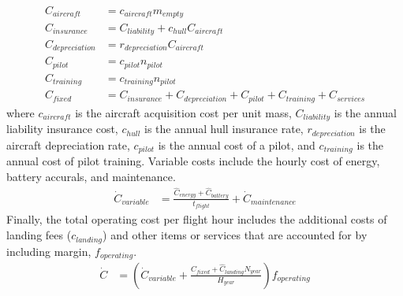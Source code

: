 \documentclass[12pt, letter]{article}
\begin{document}
\begin{align}
	C_{aircraft}&=c_{aircraft} m_{empty}\\
	C_{insurance}&=C_{liability}+c_{hull} C_{aircraft}\\
	C_{depreciation}&=r_{depreciation} C_{aircraft}\\
	C_{pilot}&=c_{pilot} n_{pilot}\\
	C_{training}&=c_{training} n_{pilot}\\
	C_{fixed}&=C_{insurance}+C_{depreciation}+C_{pilot}+C_{training}+C_{services}
\end{align}
where $c_{aircraft}$ is the aircraft acquisition cost per unit mass, $C_{liability}$ is the annual liability insurance cost, $c_{hull}$ is the annual hull insurance rate, $r_{depreciation}$ is the aircraft depreciation rate, $c_{pilot}$ is the annual cost of a pilot, and $c_{training}$ is the annual cost of pilot training. Variable costs include the hourly cost of energy, battery accurals, and maintenance.
\begin{align}
	\dot{C}_{variable}&=\frac{\hat{C}_{energy}+\hat{C}_{battery}}{t_{flight}}+\dot{C}_{maintenance}
\end{align}
Finally, the total operating cost per flight hour includes the additional costs of landing fees ($c_{landing}$) and other items or services that are accounted for by including margin, $f_{operating}$.
\begin{align}
	\dot{C}&=\left(\dot{C}_{variable}+\frac{C_{fixed}+\hat{C}_{landing}N_{year}}{H_{year}}\right)f_{operating}
\end{align}
\end{document}
